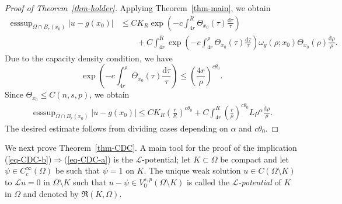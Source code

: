 \documentclass[11pt]{amsart}
\theoremstyle{plain}
\theoremstyle{definition}
\numberwithin{equation}{section}
\DeclareMathOperator*{\esssup}{esssup}
\begin{document}
\begin{proof}[Proof of Theorem~\ref{thm-holder}]
    Applying Theorem~\ref{thm-main}, we obtain
    \begin{equation*}   
    \begin{aligned}
        \esssup_{\Omega\cap B_r(x_0)}|u-g(x_0)| &\leq CK_R\exp\left(-c \int_{4r}^R \Theta_{x_0}(\tau)\frac{\mathrm{d} \tau}{\tau}\right)\\
        &\qquad+C\int_{4r}^R\exp\left(-c \int_{4r}^{\rho} \Theta_{x_0}(\tau)\frac{\mathrm{d} \tau}{\tau}\right) \omega_g(\rho; x_0)\Theta_{x_0}(\rho)\frac{\mathrm{d}\rho}{\rho}.
    \end{aligned}
\end{equation*}
Due to the capacity density condition, we have 
\begin{equation*}
    \exp\left(-c \int_{4r}^{\rho} \Theta_{x_0}(\tau)\frac{\mathrm{d} \tau}{\tau}\right) \leq \left(\frac{4r}{\rho}\right)^{c\theta_0}.
\end{equation*}
Since $\Theta_{x_0} \leq C(n, s, p)$, we obtain
\begin{equation*}
     \begin{aligned}
        \esssup_{\Omega\cap B_r(x_0)}|u-g(x_0)| \leq CK_R\left(\frac{r}{R}\right)^{c\theta_0}+C\int_{4r}^R\left(\frac{r}{\rho}\right)^{c\theta_0} L\rho^{\alpha}\frac{\mathrm{d}\rho}{\rho}.
    \end{aligned}
\end{equation*}
The desired estimate follows from dividing cases depending on $\alpha$ and $c\theta_0$.
\end{proof}




We next prove Theorem~\ref{thm-CDC}. A main tool for the proof of the implication (\ref{eq-CDC-b})$\Rightarrow$(\ref{eq-CDC-a}) is the $\mathcal{L}$-potential; let $K \subset \Omega$ be compact and let $\psi \in C^\infty_c(\Omega)$ be such that $\psi=1$ on $K$. The unique weak solution $u \in C(\Omega \setminus K)$ to $\mathcal{L}u=0$ in $\Omega \setminus K$ such that $u-\psi \in V^{s, p}_0(\Omega\setminus K)$ is called the \emph{$\mathcal{L}$-potential} of $K$ in $\Omega$ and denoted by $\mathfrak{R}(K, \Omega)$.
\end{document}
